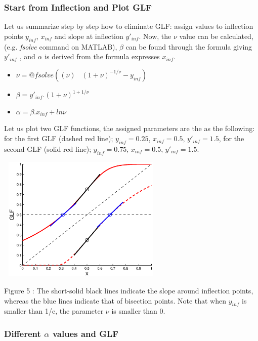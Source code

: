 \documentclass[twocolumn]{article}
\begin{document}
\subsubsection{Start from Inflection and Plot GLF}
Let us summarize step by step how to eliminate GLF: assign values to inflection points $y_{inf}$, $x_{inf}$ and slope at inflection $y'_{inf}$. Now, the $\nu$ value can be calculated, (e.g. \textit{fsolve} command on MATLAB), $\beta$ can be found through the formula giving $y'_{inf}$ , and $\alpha$ is derived from the formula expresses $x_{inf}$.

\begin{itemize}
\item $\nu=@fsolve((\nu) \;\;\; (1+\nu)^{-1/\nu}-y_{inf})$
\item $\beta=y'_{inf}.(1+\nu)^{1+1/\nu}$
\item $\alpha=\beta.x_{inf}+ln\nu$
\end{itemize}

Let us plot two GLF functions, the assigned parameters are the as the following: for the first GLF (dashed red line); $y_{inf}=0.25$, $x_{inf}=0.5$, $y'_{inf}=1.5$, for the second GLF (solid red line); $y_{inf}=0.75$, $x_{inf}=0.5$, $y'_{inf}=1.5$.  

\begin{center}
\includegraphics[width=80mm,height=60mm]{glf_first.eps} 
   \begin{footnotesize} Figure 5 : The short-solid black lines indicate the slope around inflection points, whereas the blue lines indicate that of bisection points. Note that when $y_{inf}$ is smaller than 1/e, the parameter $\nu$ is smaller than 0.  \end{footnotesize}
\end{center}

\subsubsection{Different $\alpha$ values and GLF }
\end{document}
